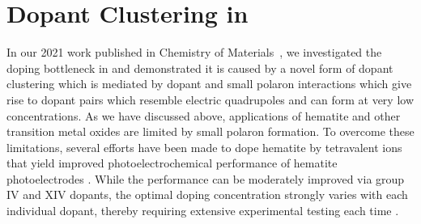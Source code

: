 \def\be{\Delta_{quad}}

\section{Dopant Clustering in }

In our 2021 work published in Chemistry of Materials~\cite{smart2021doping}, we investigated the doping bottleneck in  and demonstrated it is caused by a novel form of dopant clustering which is mediated by dopant and small polaron interactions which give rise to dopant pairs which resemble electric quadrupoles and can form at very low concentrations.
As we have discussed above, applications of hematite and other transition metal oxides are limited by small polaron formation.
To overcome these limitations, several efforts have been made to dope hematite by tetravalent ions that yield improved photoelectrochemical performance of hematite photoelectrodes
\cite{lohaus2018limitation,biswas2020tuning,ling2011sn,li2017morphology,kumar2011electrodeposited,fu2014highly,malviya2017influence,yang2013new,tian2020electronic,liu2013ge}.
While the performance can be moderately improved via group IV and XIV dopants, the optimal doping concentration strongly varies with each individual dopant,\cite{kumar2011electrodeposited,fu2014highly,malviya2017influence,yang2013new,tian2020electronic,liu2013ge} thereby requiring extensive experimental testing each time \cite{walsh2017instilling}.

